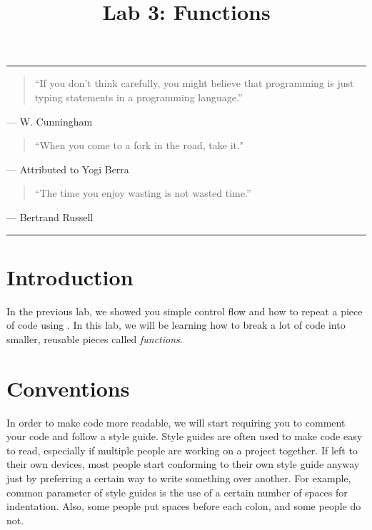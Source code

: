 \documentclass[11pt]{cselabheader}
\title{Lab 3: Functions}
\begin{document}
\maketitle

\hrule
\begin{quotation}
``If you don't think carefully, you might believe that programming is just
typing statements in a programming language.''
\end{quotation}
\begin{flushright}
  --- W. Cunningham
\end{flushright}

\begin{quotation}
``When you come to a fork in the road, take it."
\end{quotation}
\begin{flushright}
--- Attributed to Yogi Berra
\end{flushright}

\begin{quotation}
``The time you enjoy wasting is not wasted time.''
\end{quotation}
\begin{flushright}
  --- Bertrand Russell
\end{flushright}
\hrule

\tableofcontents

\pagebreak
{}

\section{Introduction}
\label{sec:intro}

In the previous lab, we showed you simple control flow and how to repeat a piece
of code using . In this lab, we will be learning how to
break a lot of code into smaller, reusable pieces called \emph{functions}.


\pagebreak
\section{Conventions}
\label{sec:pep8}

In order to make code more readable, we will start requiring you to comment your
code and follow a style guide. Style guides are often used to make code easy to
read, especially if multiple people are working on a project together. If left
to their own devices, most people start conforming to their own style guide
anyway just by preferring a certain way to write something over another. For
example, common parameter of style guides is the use of a certain number of
spaces for indentation. Also, some people put spaces before each colon, and some
people do not.
\end{document}
